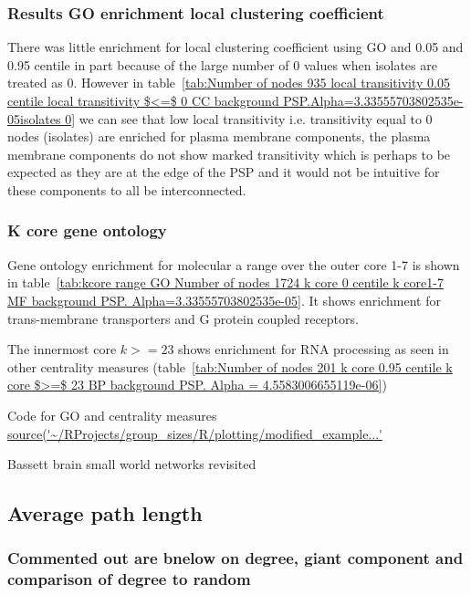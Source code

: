 \subsubsection{Results GO enrichment local clustering coefficient}

There was little enrichment for local clustering coefficient using GO and 0.05 and 0.95 centile in part because of the large number of 0 values when isolates are treated as 0. However in table~\ref{tab:Number of nodes 935 local transitivity 0.05 centile  local transitivity $<=$ 0 CC background PSP.Alpha=3.33555703802535e-05isolates 0} we can see that low local transitivity i.e. transitivity equal to 0 nodes (isolates) are enriched for plasma membrane components, the plasma membrane components do not show marked transitivity which is perhaps to be expected as they are at the edge of the PSP and it would not be intuitive for these components to all be interconnected. 

\subsubsection{K core gene ontology}
 
 Gene ontology enrichment for molecular  a range over the outer core 1-7 is shown in table~\ref{tab:kcore range GO Number of nodes 1724 k core 0 centile  k core1-7 MF background PSP. Alpha=3.33555703802535e-05}. It shows enrichment for trans-membrane transporters and G protein coupled receptors. 
 
 The innermost core $k>=23$ shows enrichment for RNA processing as seen in other centrality measures (table~\ref{tab:Number of nodes 201 k core 0.95 centile  k core $>=$ 23 BP background PSP. Alpha = 4.5583006655119e-06})

Code for GO and centrality measures \url{source('~/RProjects/group_sizes/R/plotting/modified_example...'} 
 
 Bassett \cite{bassett2017small} brain small world networks revisited
\subsection{Average path length}
 \label{sec:Centrality intro average path length}

\subsubsection{Commented out are bnelow on degree, giant component and comparison of degree to random}


